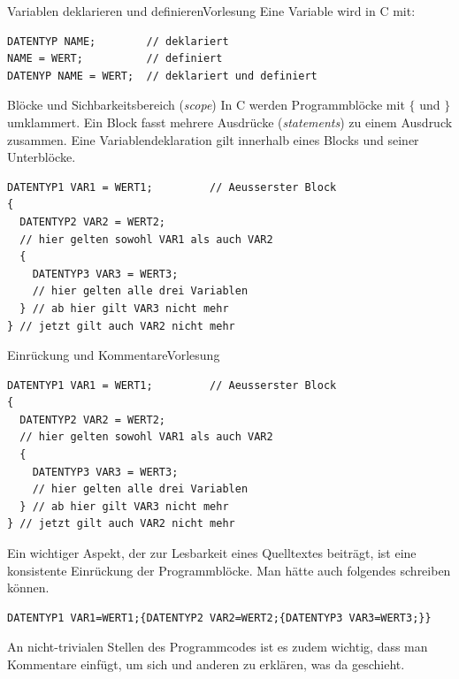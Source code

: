\documentclass[xcolor=dvipsnames]{beamer}
\newcounter{lecturecounter}
\begin{document}
\begin{frame}[fragile]{Variablen deklarieren und definieren}{Vorlesung }
 Eine Variable wird in C mit:
\begin{lstlisting}
DATENTYP NAME;        // deklariert
NAME = WERT;          // definiert
DATENYP NAME = WERT;  // deklariert und definiert
\end{lstlisting}
 \begin{block}{Blöcke und Sichbarkeitsbereich (\emph{scope})}
 In C werden Programmblöcke mit $\lbrace$ und $\rbrace$ umklammert.
 Ein Block fasst mehrere Ausdrücke (\emph{statements}) zu einem Ausdruck zusammen.
 Eine Variablendeklaration gilt innerhalb eines Blocks und seiner Unterblöcke.
 \end{block}
\begin{lstlisting}
DATENTYP1 VAR1 = WERT1;         // Aeusserster Block
{
  DATENTYP2 VAR2 = WERT2;
  // hier gelten sowohl VAR1 als auch VAR2
  {
    DATENTYP3 VAR3 = WERT3;
    // hier gelten alle drei Variablen
  } // ab hier gilt VAR3 nicht mehr
} // jetzt gilt auch VAR2 nicht mehr
\end{lstlisting}
\end{frame}

\begin{frame}[fragile]{Einrückung und Kommentare}{Vorlesung }
\begin{lstlisting}
DATENTYP1 VAR1 = WERT1;         // Aeusserster Block
{
  DATENTYP2 VAR2 = WERT2;
  // hier gelten sowohl VAR1 als auch VAR2
  {
    DATENTYP3 VAR3 = WERT3;
    // hier gelten alle drei Variablen
  } // ab hier gilt VAR3 nicht mehr
} // jetzt gilt auch VAR2 nicht mehr
\end{lstlisting}
\begin{block}{}
  Ein wichtiger Aspekt, der zur Lesbarkeit eines Quelltextes beiträgt, ist eine konsistente Einrückung der Programmblöcke. Man hätte auch folgendes schreiben können.
\end{block}
\begin{lstlisting}
DATENTYP1 VAR1=WERT1;{DATENTYP2 VAR2=WERT2;{DATENTYP3 VAR3=WERT3;}}
\end{lstlisting}
\begin{block}{}
An nicht-trivialen Stellen des Programmcodes ist es zudem wichtig, dass man Kommentare einfügt, um sich und anderen zu erklären, was da geschieht. 
\end{block}
\end{frame}
\end{document}
